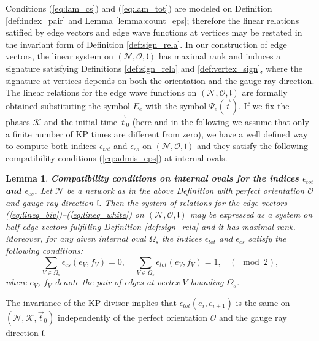 \documentclass[11pt]{amsart}
\theoremstyle{plain}
\numberwithin{equation}{section}
\newtheorem{lemma}[theorem]{Lemma}
\begin{document}
Conditions (\ref{eq:lam_cs}) and (\ref{eq:lam_tot}) are modeled on Definition \ref{def:index_pair} and Lemma \ref{lemma:count_eps}; therefore the linear relations satified by edge vectors and edge wave functions at vertices may be restated in the invariant form of Definition \ref{def:sign_rela}. 
In our construction of edge vectors, the linear system on $(\mathcal N,\mathcal O, \mathfrak l)$ has maximal rank and induces a signature satisfying Definitions \ref{def:sign_rela} and \ref{def:vertex_sign}, where the signature at vertices depends on both the orientation and the gauge ray direction. The linear relations for the edge wave functions on $(\mathcal N,\mathcal O, \mathfrak l)$ are formally obtained substituting the symbol $E_e$ with the symbol $\Psi_e(\vec t)$. If we fix the phases $\mathcal K$ and the initial time $\vec t_0$ (here and in the following we assume that only a finite number of KP times are different from zero), we have a well defined way to compute both indices $\epsilon_{tot}$ and $\epsilon_{cs}$ on $(\mathcal N,\mathcal O, \mathfrak l)$ and they satisfy the following compatibility conditions (\ref{eq:admis_eps}) at internal ovals.

\begin{lemma}\label{lem:adm_1}\textbf{Compatibility conditions on internal ovals for the indices $\epsilon_{tot}$ and $\epsilon_{cs}$.}
Let $\mathcal N$  be a network as in the above Definition with perfect orientation $\mathcal O$ and
gauge ray direction $\mathfrak l$. Then the system of relations for the edge vectors (\ref{eq:lineq_biv})--(\ref{eq:lineq_white}) 
on $(\mathcal N,\mathcal O, \mathfrak l)$ may be expressed as a system on half edge vectors fulfilling Definition \ref{def:sign_rela} and it has maximal rank.
Moreover, for any given internal oval $\Omega_s$ the indices  $\epsilon_{tot}$ and $\epsilon_{cs}$ satisfy the following conditions: 
\begin{equation}\label{eq:admis_eps}
\sum\limits_{V\in\Omega_s} \epsilon_{cs}(e_V,f_V) = 0, \ \ \ \ \ \sum\limits_{V\in\Omega_s} \epsilon_{tot}(e_V,f_V) = 1, \ \ \ \ (\!\!\!\!\!\!\mod 2),
\end{equation}
where $e_V$, $f_V$ denote the pair of edges at vertex $V$ bounding $\Omega_s$.
\end{lemma}

The invariance of the KP divisor implies that $\epsilon_{tot}(e_i, e_{i+1})$ is the same on $(\mathcal N, \mathcal K, \vec t_0)$ independently of the perfect orientation $\mathcal O$ and the gauge ray direction $\mathfrak l$. 
\end{document}
